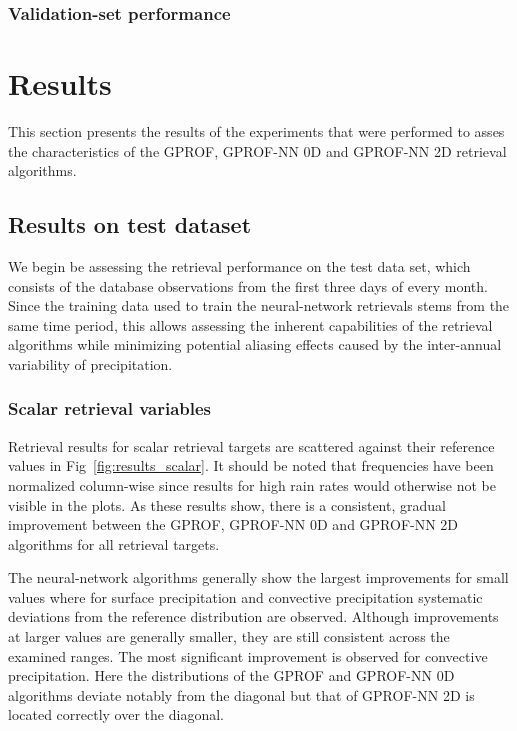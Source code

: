 \documentclass[a4paper,11pt,bibtotoc]{scrartcl}
\begin{document}
\subsubsection{Validation-set performance}


\section{Results}

This section presents the results of the experiments that were performed to
asses the characteristics of the GPROF, GPROF-NN 0D and GPROF-NN 2D retrieval
algorithms. 

\subsection{Results on test dataset}

We begin be assessing the retrieval performance on the test data set, which
consists of the database observations from the first three days of every month.
Since the training data used to train the neural-network retrievals stems from
the same time period, this allows assessing the inherent capabilities of the
retrieval algorithms while minimizing potential aliasing effects caused by the
inter-annual variability of precipitation.



\subsubsection{Scalar retrieval variables}

Retrieval results for scalar retrieval targets are scattered against their
reference values in Fig~\ref{fig:results_scalar}. It should be noted that
frequencies have been normalized column-wise since results for high rain rates
would otherwise not be visible in the plots. As these results show, there is a
consistent, gradual improvement between the GPROF, GPROF-NN 0D and GPROF-NN 2D
algorithms for all retrieval targets. 

The neural-network algorithms generally show the largest improvements for small
values where for surface precipitation and convective precipitation systematic
deviations from the reference distribution are observed. Although improvements
at larger values are generally smaller, they are still consistent across the
examined ranges. The most significant improvement is observed for convective
precipitation. Here the distributions of the GPROF and GPROF-NN 0D algorithms
deviate notably from the diagonal but that of GPROF-NN 2D is located correctly
over the diagonal.
\end{document}
